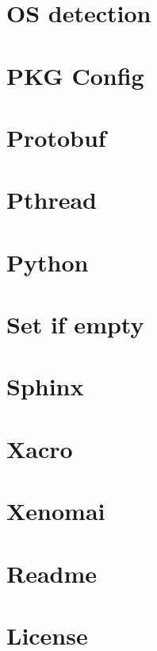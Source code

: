 \documentclass[twoside]{book}
\newcommand{\+}{\discretionary{\mbox{\scriptsize$\hookleftarrow$}}{}{}}
\begin{document}
\chapter{OS detection}
\label{md_doc_os_detection}

\chapter{P\+KG Config}
\label{md_doc_pkg_config}

\chapter{Protobuf}
\label{md_doc_protobuf}

\chapter{Pthread}
\label{md_doc_pthread}

\chapter{Python}
\label{md_doc_python}

\chapter{Set if empty}
\label{md_doc_set_if_empty}

\chapter{Sphinx}
\label{md_doc_sphinx}

\chapter{Xacro}
\label{md_doc_xacro}

\chapter{Xenomai}
\label{md_doc_xenomai}

\chapter{Readme}
\label{md_readme}

\chapter{License}
\label{license}

\end{document}
